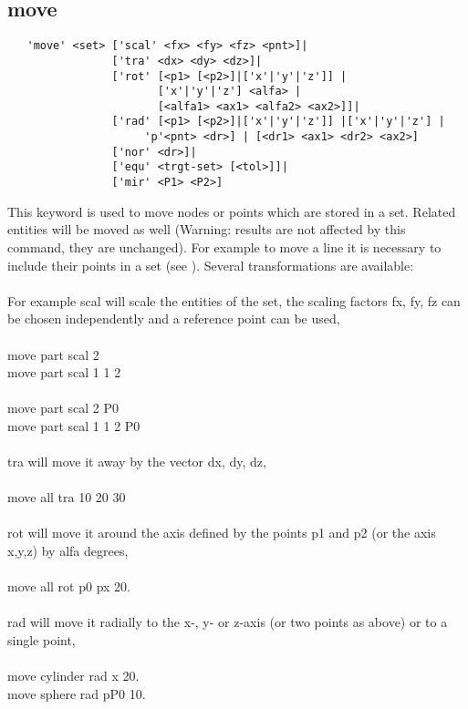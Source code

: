 \documentclass{article}
\begin{document}
\subsection{\label{move}move}
\begin{verbatim}
   'move' <set> ['scal' <fx> <fy> <fz> <pnt>]|
                ['tra' <dx> <dy> <dz>]|
                ['rot' [<p1> [<p2>]|['x'|'y'|'z']] |
                       ['x'|'y'|'z'] <alfa> |
                       [<alfa1> <ax1> <alfa2> <ax2>]]|
                ['rad' [<p1> [<p2>]|['x'|'y'|'z']] |['x'|'y'|'z'] |
                     'p'<pnt> <dr>] | [<dr1> <ax1> <dr2> <ax2>]
                ['nor' <dr>]|
                ['equ' <trgt-set> [<tol>]]|
                ['mir' <P1> <P2>]
\end{verbatim}
This keyword is used to move nodes or points which are stored in a set. Related entities will be moved as well (Warning: results are not affected by this command, they are unchanged). For example to move a line it is necessary to include their points in a set (see ). Several transformations are available:\\\\For example scal will scale the entities of the set, the scaling factors fx, fy, fz can be chosen independently and a reference point can be used,\\\\
move part scal 2 \\
move part scal 1 1 2\\\\
move part scal 2 P0\\
move part scal 1 1 2 P0\\\\
tra will move it away by the vector dx, dy, dz,\\\\
move all tra 10 20 30 \\\\
rot will move it around the axis defined by the points p1 and p2 (or the axis x,y,z) by alfa degrees,\\\\
move all rot p0 px 20.\\\\
rad will move it radially to the x-, y- or z-axis (or two points as above) or to a single point,\\\\
move cylinder rad x 20.\\
move sphere rad pP0 10.\\\\
\end{document}
